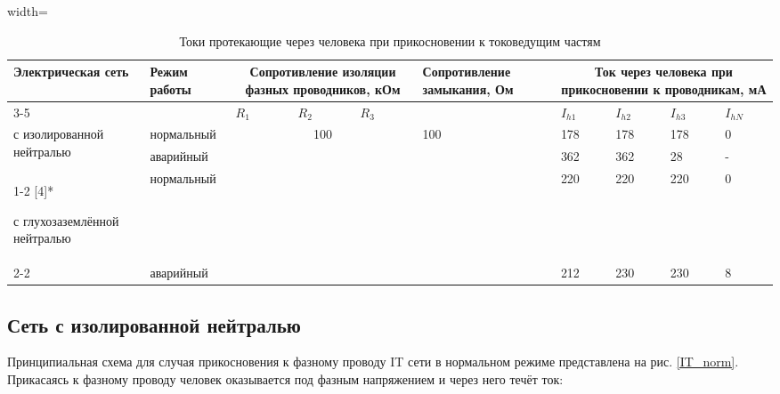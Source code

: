 	\begin{table}[h]
		\centering
		\begin{adjustbox}{width=\textwidth}
			\begin{tabular}{|m{5cm}<{\centering}|m{3cm}<{\centering}|m{1cm}|m{1cm}|m{1cm}|m{4cm}<{\centering}|m{1cm}|m{1cm}|m{1cm}|m{1cm}|} 
				\hline
				\multirow{2}[4]{*}{Электрическая сеть} & \multirow{2}[4]{*}{Режим работы} & \multicolumn{3}{c|}{\parbox{3cm}{Сопротивление изоляции фазных проводников, кОм}} & \multirow{2}[4]{*}{\parbox{4cm}{\centering Сопротивление замыкания, Ом}} & \multicolumn{4}{c|}{\parbox{3cm}{\vspace{1ex}Ток через человека при прикосновении к проводникам, мА\vspace{1ex}}}  \\ 
				\cline{3-5}\cline{7-10}
				& & $R_1$ & $R_2$ & $R_3$ & & $I_{h1}$ & $I_{h2}$ & $I_{h3}$ & $I_{hN}$ \\ 
				\hline
				\multirow{2}[4]{*}{\parbox{5cm}{с изолированной нейтралью\vspace{1ex}} }
				& нормальный  & \multicolumn{3}{c|}{100} & 100 & 178 & 178 & 178 & 0 \\ 
				\cline{2-2}\cline{7-10}
				& аварийный   & \multicolumn{3}{c|}{}     &     & 362 & 362 & 28  & - \\ 
				\cline{1-2}\cline{7-10}
				\multirow{2}[4]{*}{\parbox{5cm}{с глухозаземлённой нейтралью\vspace{1ex}}} 
				& нормальный  & \multicolumn{3}{c|}{}     &     & 220 & 220 & 220 & 0 \\ 
				\cline{2-2}\cline{7-10}
				& аварийный   & \multicolumn{3}{c|}{}     &     & 212 & 230 & 230 & 8 \\
				\hline
			\end{tabular}
		\end{adjustbox}
		\caption{Токи протекающие через человека при прикосновении к токоведущим частям}
		\label{table_currents}
	\end{table}
	
	\subsection{Сеть с изолированной нейтралью}
	
	Принципиальная схема для случая прикосновения к фазному проводу IT сети в нормальном режиме представлена на рис. \ref{IT_norm}. Прикасаясь к фазному проводу человек оказывается под фазным напряжением и через него течёт ток:
	
